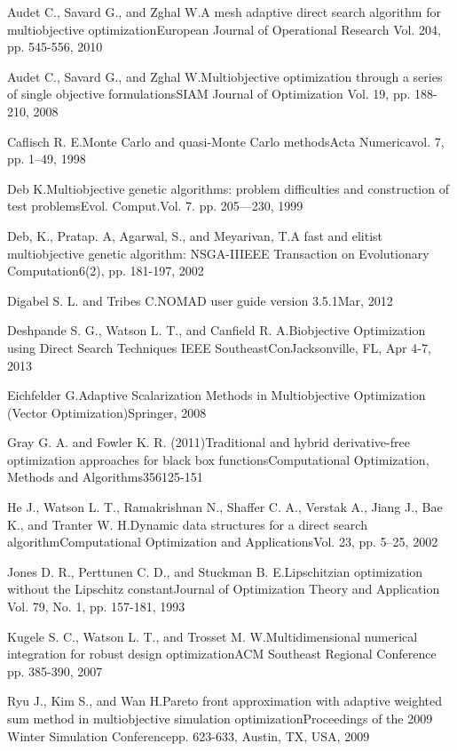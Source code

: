 {Audet C., Savard G., and Zghal W.}{A mesh adaptive direct search algorithm 
for multiobjective optimization}{European Journal of Operational Research}
{Vol. 204, pp. 545-556, 2010}

{Audet C., Savard G., and Zghal W.}{Multiobjective optimization through a 
series of single objective formulations}{SIAM Journal of Optimization}
{Vol. 19, pp. 188-210, 2008}

{Caflisch R. E.}{Monte Carlo and quasi-Monte Carlo methods}{Acta Numerica}{vol. 
7, pp. 1--49, 1998}

{Deb K.}{Multiobjective genetic algorithms: problem difficulties and 
construction of test problems}{Evol. Comput.}{Vol. 7. pp. 205---230, 1999}

{Deb, K., Pratap. A, Agarwal, S., and Meyarivan, T.}{A fast and elitist 
multiobjective genetic algorithm: NSGA-II}{IEEE Transaction on Evolutionary 
Computation}{6(2), pp. 181-197, 2002}

{Digabel S. L. and Tribes C.}{NOMAD user guide version 3.5.1}{Mar, 2012}

{Deshpande S. G., Watson L. T., and Canfield R. A.}{Biobjective Optimization 
using Direct Search Techniques }{IEEE SoutheastCon}{Jacksonville, FL, Apr 4-7, 
2013}

{Eichfelder G.}{Adaptive Scalarization Methods in Multiobjective Optimization 
(Vector Optimization)}{Springer, 2008}

{Gray G. A. and Fowler K. R. (2011)}{Traditional and hybrid derivative-free 
optimization approaches for black box functions}{Computational Optimization, 
Methods and Algorithms}{356}{125-151}

{He J., Watson L. T., Ramakrishnan N., Shaffer C. A., Verstak A., Jiang J., 
Bae K., and Tranter W. H.}{Dynamic data structures for a direct search 
algorithm}{Computational Optimization and Applications}{Vol. 23, pp. 5--25, 
2002} 

{Jones D. R., Perttunen  C. D., and Stuckman B. E.}{Lipschitzian optimization
without the Lipschitz constant}{Journal of Optimization Theory and Application} 
{Vol. 79, No. 1, pp. 157-181, 1993}

{Kugele S. C., Watson L. T., and Trosset M. W.}{Multidimensional numerical 
integration for robust design optimization}{ACM Southeast Regional Conference}
{pp. 385-390, 2007}

{Ryu J., Kim S., and Wan H.}{Pareto front approximation with adaptive weighted 
sum method in multiobjective simulation optimization}{Proceedings of the 2009
Winter Simulation Conference}{pp. 623-633, Austin, TX, USA, 2009}

